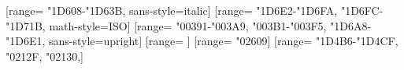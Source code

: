 \usepackage{polyglossia}

\usepackage{textcomp}

\usepackage{xltxtra}
	\setsansfont{CMU Sans Serif}
	\setmonofont{CMU Typewriter Text}
\usepackage{amsfonts}
\usepackage{unicode-math}
	[range={
		"1D608-"1D63B},	%
		sans-style=italic]
	[range={
		"1D6E2-"1D6FA,	%
		"1D6FC-"1D71B},	%
		math-style=ISO]
	[range={
		"00391-"003A9,	%
		"003B1-"003F5,	%
		"1D6A8-"1D6E1},	%
		sans-style=upright]
	[range={
		\mathbin}] %
	[range={
		"02609}] %
	[range={
		"1D4B6-"1D4CF,
		"0212F,
		"02130,}] %

\usepackage{xeCJK}